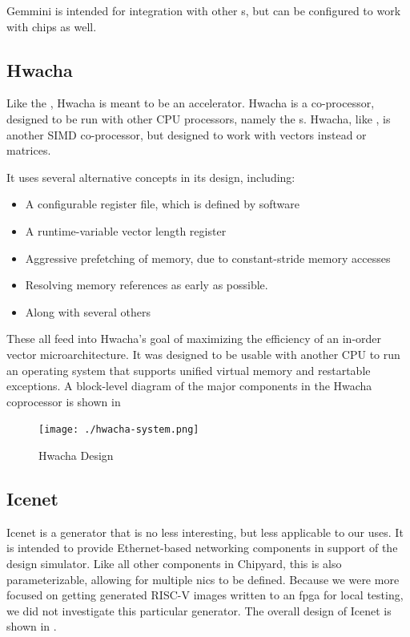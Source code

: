 Gemmini is intended for integration with other s, but can be configured to work with  chips as well.

\subsection{Hwacha}\label{sec:Hwacha}
\nocite{hwachaGithub}
\nocite{hwachaPresentation}
Like the , Hwacha is meant to be an accelerator.
Hwacha is a co-processor, designed to be run with other CPU processors, namely the s.
Hwacha, like , is another SIMD co-processor, but designed to work with vectors instead or matrices.

It uses several alternative concepts in its design, including:
\begin{itemize}
\item A configurable register file, which is defined by software
\item A runtime-variable vector length register
\item Aggressive prefetching of memory, due to constant-stride memory accesses
\item Resolving memory references as early as possible.
\item Along with several others
\end{itemize}

These all feed into Hwacha's goal of maximizing the efficiency of an in-order vector microarchitecture.
It was designed to be usable with another CPU to run an operating system that supports unified virtual memory and restartable exceptions.
A block-level diagram of the major components in the Hwacha coprocessor is shown in 

\begin{figure}[h!tbp]
  \centering
  \texttt{[image: ./hwacha-system.png]}
  \caption{Hwacha Design~\cite[p.~11]{hwachaPresentation}}
  \label{fig:Hwacha_Accelerator}
\end{figure}

\subsection{Icenet}\label{sec:Icenet_Generator}
\nocite{icenetGithub}
Icenet is a generator that is no less interesting, but less applicable to our uses.
It is intended to provide Ethernet-based networking components in support of the  design simulator.
Like all other components in Chipyard, this is also parameterizable, allowing for multiple \Glspl{nic} to be defined.
Because we were more focused on getting generated RISC-V images written to an \Gls{fpga} for local testing, we did not investigate this particular generator.
The overall design of Icenet is shown in .

